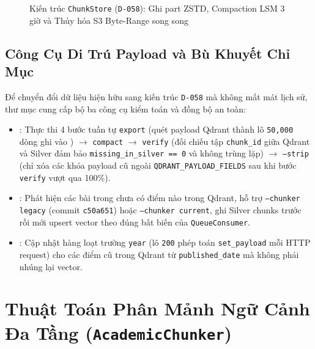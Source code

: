 \begin{figure}[htbp]
  \centering
  \DrawChunkStoreArchitecture
  \caption[Kiến trúc ChunkStore D-058: Ghi part ZSTD, Compaction và Đọc dải byte S3]{Kiến trúc \texttt{ChunkStore} (\texttt{D-058}): Ghi part ZSTD, Compaction LSM 3 giờ và Thủy hóa S3 Byte-Range song song}
  \label{fig:chunkstore_arch}
\end{figure}

\subsection{Công Cụ Di Trú Payload và Bù Khuyết Chỉ Mục}
\label{sec:ch2_migration_tools}

Để chuyển đổi dữ liệu hiện hữu sang kiến trúc \texttt{D-058} mà không mất mát lịch sử, thư mục  cung cấp bộ ba công cụ kiểm toán và đồng bộ an toàn:
\begin{itemize}
  \item {}: Thực thi 4 bước tuần tự \texttt{export} (quét payload Qdrant thành lô \texttt{50,000} dòng ghi vào ) $\rightarrow$ \texttt{compact} $\rightarrow$ \texttt{verify} (đối chiếu tập \texttt{chunk\_id} giữa Qdrant và Silver đảm bảo \texttt{missing\_in\_silver == 0} và không trùng lặp) $\rightarrow$ \texttt{--strip} (chỉ xóa các khóa payload cũ ngoài \texttt{QDRANT\_PAYLOAD\_FIELDS} sau khi bước \texttt{verify} vượt qua 100\%).
  \item {}: Phát hiện các bài trong  chưa có điểm nào trong Qdrant, hỗ trợ \texttt{--chunker legacy} (commit \texttt{c50a651}) hoặc \texttt{--chunker current}, ghi Silver chunks trước rồi mới upsert vector theo đúng bất biến của \texttt{QueueConsumer}.
  \item {}: Cập nhật hàng loạt trường \texttt{year} (lô \texttt{200} phép toán \texttt{set\_payload} mỗi HTTP request) cho các điểm cũ trong Qdrant từ \texttt{published\_date} mà không phải nhúng lại vector.
\end{itemize}

\section{Thuật Toán Phân Mảnh Ngữ Cảnh Đa Tầng (\texttt{AcademicChunker})}
\label{sec:ch2_chunker}

